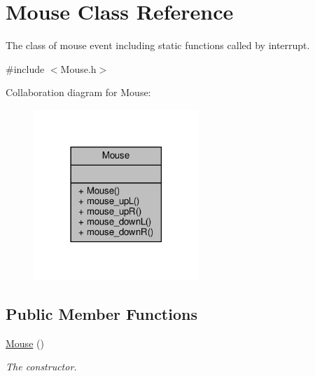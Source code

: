 \hypertarget{classMouse}{}\section{Mouse Class Reference}
\label{classMouse}


The class of mouse event including static functions called by interrupt.  




{\ttfamily \#include $<$Mouse.\+h$>$}



Collaboration diagram for Mouse\+:\nopagebreak
\begin{figure}[H]
\begin{center}
\leavevmode
\includegraphics[width=177pt]{classMouse__coll__graph}
\end{center}
\end{figure}
\subsection*{Public Member Functions}
\begin{DoxyCompactItemize}
\item 
\mbox{\label{classMouse_a99024d3700d649ae19c1537b42a3e86d}} 
\hyperlink{classMouse_a99024d3700d649ae19c1537b42a3e86d}{Mouse} ()
\begin{DoxyCompactList}\small\item\em The constructor. \end{DoxyCompactList}\end{DoxyCompactItemize}

